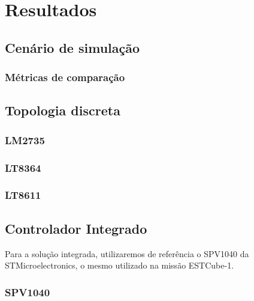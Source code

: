 \chapter{Resultados} \label{resultados}

\section{Cenário de simulação}

\subsection*{Métricas de comparação}

\section{Topologia discreta}

\subsection*{LM2735}
\subsection*{LT8364}
\subsection*{LT8611}

\section{Controlador Integrado}

Para a solução integrada, utilizaremos de referência o SPV1040 da STMicroelectronics, o mesmo utilizado na missão ESTCube-1.
\subsection*{SPV1040}